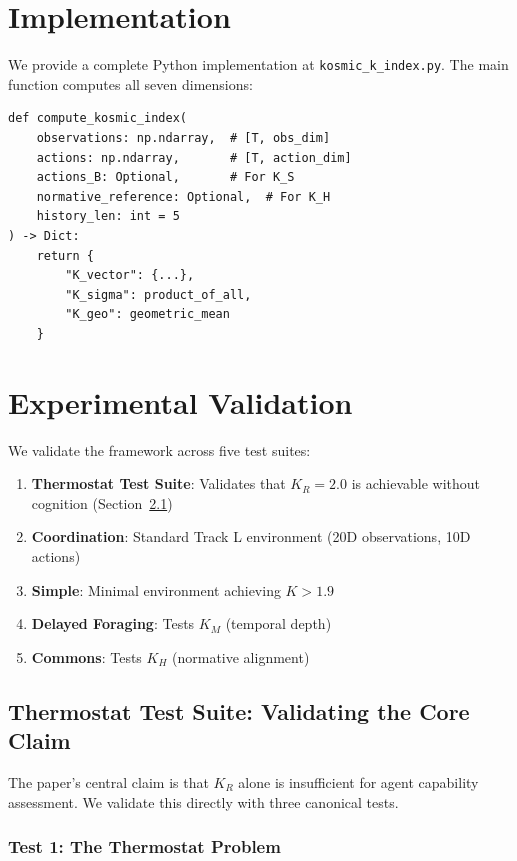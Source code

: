 \documentclass[11pt,a4paper]{article}
\newcommand{\km}{K_M}
\newcommand{\kh}{K_H}
\begin{document}
\section{Implementation}

We provide a complete Python implementation at \texttt{kosmic\_k\_index.py}. The main function computes all seven dimensions:

\begin{verbatim}
def compute_kosmic_index(
    observations: np.ndarray,  # [T, obs_dim]
    actions: np.ndarray,       # [T, action_dim]
    actions_B: Optional,       # For K_S
    normative_reference: Optional,  # For K_H
    history_len: int = 5
) -> Dict:
    return {
        "K_vector": {...},
        "K_sigma": product_of_all,
        "K_geo": geometric_mean
    }
\end{verbatim}

\section{Experimental Validation}

We validate the framework across five test suites:

\begin{enumerate}
    \item \textbf{Thermostat Test Suite}: Validates that $K_R = 2.0$ is achievable without cognition (Section~\ref{sec:thermostat})
    \item \textbf{Coordination}: Standard Track L environment (20D observations, 10D actions)
    \item \textbf{Simple}: Minimal environment achieving $K > 1.9$
    \item \textbf{Delayed Foraging}: Tests $\km$ (temporal depth)
    \item \textbf{Commons}: Tests $\kh$ (normative alignment)
\end{enumerate}

\subsection{Thermostat Test Suite: Validating the Core Claim}
\label{sec:thermostat}

The paper's central claim is that $K_R$ alone is insufficient for agent capability assessment. We validate this directly with three canonical tests.

\subsubsection{Test 1: The Thermostat Problem}
\end{document}
